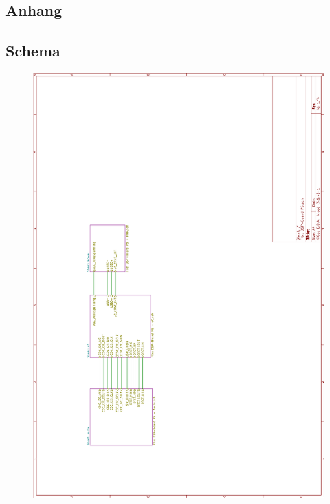 \begin{appendix} %
\section{Anhang}
\label{sec:Anhang}

\subsection{Schema}
\label{app:Schema}

\begin{figure}[h!]
	\centering
	\includegraphics[width=0.95\linewidth]{appendix/DSP-Board Schema V1-1 (1).pdf}
\end{figure}


\end{appendix}
